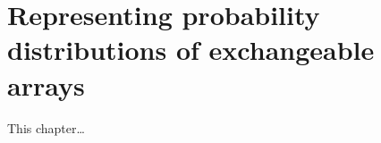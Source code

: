
\inbpdocument

\chapter{Representing probability distributions of exchangeable arrays}
\label{ch:networks}

This chapter\dots

\outbpdocument{


}
